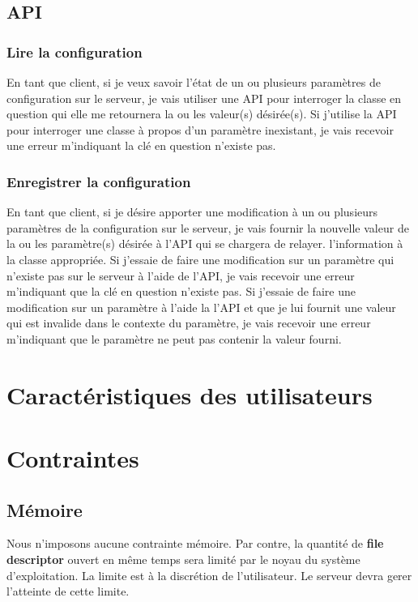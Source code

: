 \documentclass{scrreprt}
\begin{document}
\subsection{API}
\subsubsection{Lire la configuration}
En tant que client, si je veux savoir l'état de un ou plusieurs paramètres de
configuration sur le serveur, je vais utiliser une API pour interroger la 
classe en question qui elle me retournera la ou les valeur(s) désirée(s).
Si j'utilise la API pour interroger une classe à propos d'un paramètre 
inexistant, je vais recevoir une erreur m'indiquant la clé en question
n'existe pas.

\subsubsection{Enregistrer la configuration}
En tant que client, si je désire apporter une modification à un ou plusieurs
paramètres de la configuration sur le serveur, je vais fournir la nouvelle valeur
de la ou les paramètre(s) désirée à l'API qui se chargera de relayer.
l'information à la classe appropriée.
Si j'essaie de faire une modification sur un paramètre qui n'existe pas sur le
serveur à l'aide de l'API, je vais recevoir une erreur m'indiquant que la clé en
question n'existe pas.
Si j'essaie de faire une modification sur un paramètre à l'aide la l'API et que  
je lui fournit une valeur qui est invalide dans le contexte du paramètre, je 
vais recevoir une erreur m'indiquant que le paramètre ne peut pas contenir
la valeur fourni.
\section{Caractéristiques des utilisateurs}

\section{Contraintes}

\subsection{Mémoire}
Nous n'imposons aucune contrainte mémoire. Par contre, la quantité de
\textbf{file descriptor} ouvert en même temps sera limité par le noyau du
système d'exploitation. La limite est à la discrétion de l'utilisateur. Le
serveur devra gerer l'atteinte de cette limite.
\end{document}
